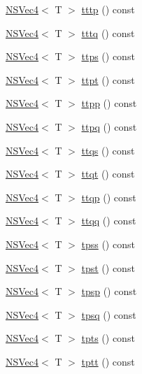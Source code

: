 \begin{DoxyCompactItemize}
\item 
\hyperlink{structNSVec4}{N\-S\-Vec4}$<$ T $>$ \hyperlink{structNSVec4_a46943d3443885165b800651f143a0b9f}{tttp} () const 
\item 
\hyperlink{structNSVec4}{N\-S\-Vec4}$<$ T $>$ \hyperlink{structNSVec4_a8571247f7ffc0d0f41e18a718cf9de12}{tttq} () const 
\item 
\hyperlink{structNSVec4}{N\-S\-Vec4}$<$ T $>$ \hyperlink{structNSVec4_a5d849b32adcf5f3c2572178e92116923}{ttps} () const 
\item 
\hyperlink{structNSVec4}{N\-S\-Vec4}$<$ T $>$ \hyperlink{structNSVec4_a7634f1068ec43a0481812c80a27a5ce3}{ttpt} () const 
\item 
\hyperlink{structNSVec4}{N\-S\-Vec4}$<$ T $>$ \hyperlink{structNSVec4_a27efd9ee9de7e0a33a3eb03fcdbf151c}{ttpp} () const 
\item 
\hyperlink{structNSVec4}{N\-S\-Vec4}$<$ T $>$ \hyperlink{structNSVec4_a1895f68d7184bb0fbae794b24e8683c4}{ttpq} () const 
\item 
\hyperlink{structNSVec4}{N\-S\-Vec4}$<$ T $>$ \hyperlink{structNSVec4_ad2fbd1dc05950cd97a4382114cdede2a}{ttqs} () const 
\item 
\hyperlink{structNSVec4}{N\-S\-Vec4}$<$ T $>$ \hyperlink{structNSVec4_a56fd69cd2ae9697add05371df2d4165a}{ttqt} () const 
\item 
\hyperlink{structNSVec4}{N\-S\-Vec4}$<$ T $>$ \hyperlink{structNSVec4_abd6d9ab167fbd58b50fcbadcd6548f0d}{ttqp} () const 
\item 
\hyperlink{structNSVec4}{N\-S\-Vec4}$<$ T $>$ \hyperlink{structNSVec4_ab20569cd2cb95fd5f4d0fbad2c7f0af2}{ttqq} () const 
\item 
\hyperlink{structNSVec4}{N\-S\-Vec4}$<$ T $>$ \hyperlink{structNSVec4_a8a67daa8edad54771c2aa2304727227d}{tpss} () const 
\item 
\hyperlink{structNSVec4}{N\-S\-Vec4}$<$ T $>$ \hyperlink{structNSVec4_a9543ca94e04ba3792d51a6b610e6aee6}{tpst} () const 
\item 
\hyperlink{structNSVec4}{N\-S\-Vec4}$<$ T $>$ \hyperlink{structNSVec4_af5492b78d96f5fab52f14c99efd68370}{tpsp} () const 
\item 
\hyperlink{structNSVec4}{N\-S\-Vec4}$<$ T $>$ \hyperlink{structNSVec4_a41410ffc961eafa1ebea795d973380e0}{tpsq} () const 
\item 
\hyperlink{structNSVec4}{N\-S\-Vec4}$<$ T $>$ \hyperlink{structNSVec4_aaf8140836070f9a812db8302339c593f}{tpts} () const 
\item 
\hyperlink{structNSVec4}{N\-S\-Vec4}$<$ T $>$ \hyperlink{structNSVec4_ae20fe5a4366e0cc6419db9d5d11aa1e8}{tptt} () const 

\end{DoxyCompactItemize}
